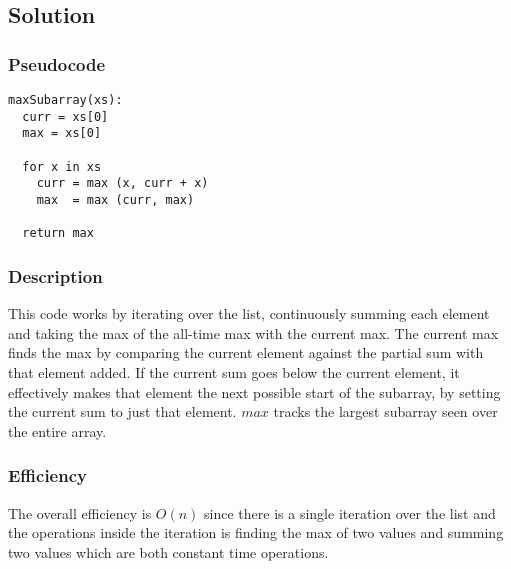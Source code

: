 \subsection*{Solution}

\subsubsection*{Pseudocode}
\begin{verbatim}
maxSubarray(xs):
  curr = xs[0]
  max = xs[0]

  for x in xs
    curr = max (x, curr + x)
    max  = max (curr, max)

  return max
\end{verbatim}

\subsubsection*{Description}
This code works by iterating over the list, continuously summing each element and taking the max of the all-time max with the current max. The current max finds the max by comparing the current element against the partial sum with that element added. If the current sum goes below the current element, it effectively makes that element the next possible start of the subarray, by setting the current sum to just that element. $max$ tracks the largest subarray seen over the entire array. 

\subsubsection*{Efficiency}

The overall efficiency is $O(n)$ since there is a single iteration over the list and the operations inside the iteration is finding the max of two values and summing two values which are both constant time operations.
